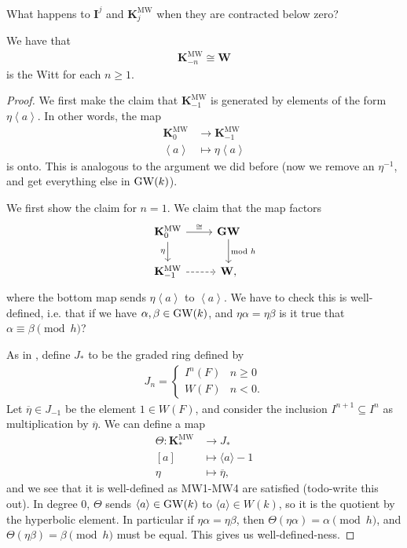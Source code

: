 \documentclass[11pt,openany]{book}
\providecommand{\KMW}{\mathbf{K}^\mathrm{MW}}
\begin{document}
What happens to $\mathbf{I}^j$ and $\KMW_j$ when they are contracted below zero?

\begin{proposition} We have that
\begin{align*}
    \KMW_{-n} \cong \mathbf{W}
\end{align*}
is the Witt for each $n \ge 1$.
\end{proposition}
\begin{proof} We first make the claim that $\KMW_{-1}$ is generated by elements of the form $\eta \left\langle a \right\rangle$. In other words, the map
\begin{align*}
    \KMW_0 &\to \KMW_{-1} \\
    \left\langle a \right\rangle &\mapsto \eta \left\langle a \right\rangle
\end{align*}
is onto. This is analogous to the argument we did before (now we remove an $\eta^{-1}$, and get everything else in $\mathrm{GW}(k)$).


We first show the claim for $n=1$. We claim that the map factors
\[ \begin{tikzcd}
    \KMW_0\rar["\cong"]\dar["\eta" left] & \mathbf{GW}\dar["\text{mod }h" right]\\
    \KMW_{-1}\rar[dashed] & \mathbf{W},
\end{tikzcd} \]
where the bottom map sends $\eta \left\langle a \right\rangle$ to $\left\langle a \right\rangle$.
We have to check this is well-defined, i.e. that if we have $\alpha,\beta\in \mathrm{GW}(k)$, and $\eta \alpha = \eta\beta$ is it true that $\alpha \equiv \beta \pmod{h}$?

As in \cite[\S3.2]{Morel}, define $J_\ast$ to be the graded ring defined by
\begin{align*}
    J_n = \begin{cases}
        I^n(F) & n\ge 0 \\
        W(F) & n<0.
    \end{cases}
\end{align*}
Let $\overline{\eta} \in J_{-1}$ be the element $1\in W(F)$, and consider the inclusion $I^{n+1} \subseteq I^n$ as multiplication by $\overline{\eta}$. We can define a map
\begin{align*}
    \Theta \colon \KMW_\ast &\to J_\ast \\
    [a] &\mapsto \langle a\rangle -1 \\
    \eta &\mapsto \overline{\eta},
\end{align*}
and we see that it is well-defined as MW1-MW4 are satisfied (todo-write this out). In degree 0, $\Theta$ sends $\langle a\rangle \in \mathrm{GW}(k)$ to $\langle a\rangle \in W(k)$, so it is the quotient by the hyperbolic element. In particular if $\eta \alpha = \eta \beta$, then $\Theta(\eta\alpha) = \alpha \pmod{h}$, and $\Theta(\eta \beta) = \beta \pmod{h}$ must be equal. This gives us well-defined-ness.


\end{proof}
\end{document}
